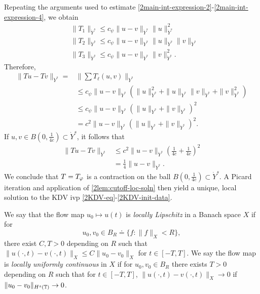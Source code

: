 Repeating the arguments used to estimate 
\eqref{2main-int-expression-2}-\eqref{2main-int-expression-4}, we obtain
%
\begin{equation*}
	\begin{split}
		& \|T_1\|_{\dot{Y}^s} \le c_\psi \|u -v \|_{\dot{Y}^s} \|u\|^2_{\dot{Y}^s}
		\\
		& \|T_2\|_{\dot{Y}^s} \le c_\psi \|u -v \|_{\dot{Y}^s} \|u\|_{\dot{Y}^s} \|v\|_{\dot{Y}^s}
		\\
		& \|T_3\|_{\dot{Y}^s} \le c_\psi \|u -v \|_{\dot{Y}^s} \|v\|_{\dot{Y}^s}^2.
	\end{split}
\end{equation*}
%
Therefore,
%
\begin{equation}
	\label{220a}
	\begin{split}
		\|Tu - Tv \|_{\dot{Y}^s} = & \| \sum T_\ell(u, v) \|_{\dot{Y}^s}
		\\
		& \le c_\psi \|u -v \|_{\dot{Y}^s} \left( \|u\|_{\dot{Y}^s}^2 + 
		\|u\|_{\dot{Y}^s} \|v\|_{\dot{Y}^s} + \|v\|_{\dot{Y}^s}^2 \right)
		\\
		& \le c_\psi \|u -v\|_{\dot{Y}^s} \left( \|u\|_{\dot{Y}^s} + \|v\|_{\dot{Y}^s} \right)^2
		\\
		& = c^2 \|u -v\|_{\dot{Y}^s} \left( \|u\|_{\dot{Y}^s} + \|v\|_{\dot{Y}^s} \right)^2.
	\end{split}
\end{equation}
%
If $u, v \in B(0, \frac{1}{4c}) \subset \dot{Y}^s$, it follows that
%
\begin{equation}
	\label{221a}
	\begin{split}
		\|Tu - Tv \|_{\dot{Y}^s}
		& \le c^2 \|u -v \|_{\dot{Y}^s} \left( \frac{1}{4c} + 
		\frac{1}{4c} \right)^2
		\\
		& = \frac{1}{4} \|u -v \|_{\dot{Y}^s}. 
	\end{split}
\end{equation}
%
We conclude that $T = T_{\varphi}$ is a contraction on the ball $B(0, 
\frac{1}{4c}) \subset \dot{Y}^s$. A Picard iteration and application of 
\cref{2lem:cutoff-loc-soln} then yield a unique, local
solution to the KDV ivp \eqref{2KDV-eq}-\eqref{2KDV-init-data}.
\begin{definition}
	We say that the flow map $u_0 \mapsto u(t)$ is \emph{locally Lipschitz} in a Banach
	space $X$ if for
	$$u_0, v_0 \in B_R \doteq \{f: \|f\|_X < R\},$$ there exist $C, T>0$
	depending on $R$ such that $\|u(\cdot, t) - v(\cdot, t)
	\|_X \le C \|u_{0} - v_0 \|_{X}$ for $t \in [-T, T]$. We
	say the flow map is \emph{locally uniformly
	continuous} in $X$ if for
	$u_0, v_0 \in B_R$ there exists $T >0$ depending on $R$ such that for
	$t \in [-T, T]$, $\|u(\cdot, t) - v(\cdot, t) \|_{X} \to
	0$ if $\|u_0 - v_0 \|_{H^{s}(\mathbb{T})} \to 0$. 
\end{definition}
